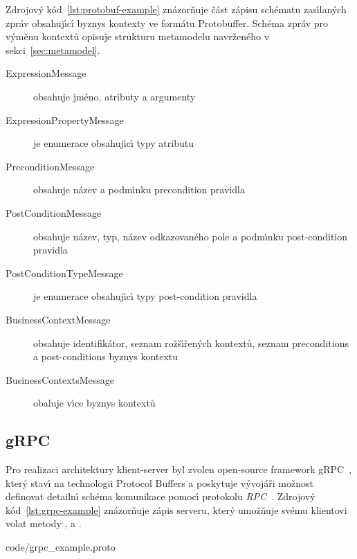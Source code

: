 

Zdrojov\'y kód~\ref{lst:protobuf-example} znázorňuje část zápisu schématu
zas\'{\i}lan\'ych zpráv obsahuj\'{\i}c\'{\i} byznys kontexty ve formátu Protobuffer.
Schéma zpráv pro v\'yměnu kontextů opisuje strukturu metamodelu navrženého
v sekci~\ref{sec:metamodel}.

\begin{description}
    \item [ExpressionMessage] obsahuje jméno, atributy a argumenty 
    \item [ExpressionPropertyMessage] je enumerace obsahuj\'{\i}c\'{\i} typy atributu 
    \item [PreconditionMessage] obsahuje název a podm\'{\i}nku precondition pravidla
    \item [PostConditionMessage] obsahuje název, typ, název odkazovaného pole a podm\'{\i}nku post-condition pravidla
    \item [PostConditionTypeMessage] je enumerace obsahuj\'{\i}c\'{\i} typy post-condition pravidla
    \item [BusinessContextMessage] obsahuje identifikátor, seznam rožš\'{\i}řen\'ych kontextů, seznam preconditions a post-conditions byznys kontextu
    \item [BusinessContextsMessage] obaluje v\'{\i}ce byznys kontextů
\end{description}

\subsection{gRPC}

Pro realizaci architektury klient-server byl zvolen
open-source framework gRPC~\cite{grpcio}, kter\'y stav\'{\i}
na technologii Protocol Buffers a poskytuje v\'yvojáři
možnost definovat detailn\'{\i} schéma komunikace pomoc\'{\i}
protokolu \textit{\gls{RPC}}~\cite{nelson1981remote}.
Zdrojov\'y kód~\ref{lst:grpc-example} znázorňuje zápis serveru,
kter\'y umožňuje svému klientovi volat metody ,
 a .


{code/grpc_example.proto}

